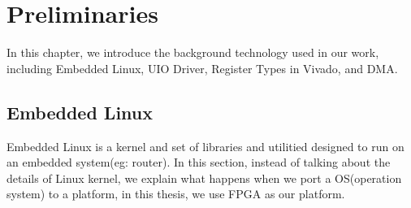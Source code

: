\chapter{Preliminaries}
\label{cha:Preliminaries}
In this chapter, we introduce the background technology used in our work, including Embedded Linux, UIO Driver, Register Types in Vivado, and DMA.



\section{Embedded Linux}
\label{sec:Embedded Linux}

Embedded Linux is a kernel and set of libraries and utilitied designed to run
on an embedded system(eg: router). In this section, instead of talking about the details of Linux kernel, we explain what happens when we port a OS(operation system) to a platform, in this thesis, we use FPGA as our platform. 

